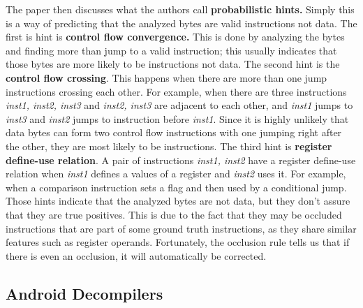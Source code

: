 \documentclass[conference,a4paper]{IEEEtran}
\begin{document}
\noindent The paper then discusses what the authors call \textbf{probabilistic hints.} Simply this is a way of predicting that the analyzed bytes are valid instructions not data. The first is hint is \textbf{control flow convergence.} This is done by analyzing the bytes and finding more than jump to a valid instruction; this usually indicates that those bytes are more likely to be instructions not data. The second hint is the \textbf{control flow crossing}. This happens when there are more than one jump instructions crossing each other. For example, when there are three instructions \emph{inst1, inst2, inst3} and \emph{inst2, inst3} are adjacent to each other, and \emph{inst1} jumps to \emph{inst3} and \emph{inst2} jumps to instruction before \emph{inst1}. Since it is highly unlikely that data bytes can form two control flow instructions with one jumping right after the other, they are most likely to be instructions. The third hint is \textbf{register define-use relation}. A pair of instructions \emph{inst1, inst2} have a register define-use relation when \emph{inst1} defines a values of a register and \emph{inst2} uses it. For example, when a comparison instruction sets a flag and then used by a conditional jump. Those hints indicate that the analyzed bytes are not data, but they don't assure that they are true positives. This is due to the fact that they may be occluded instructions that are part of some ground truth instructions, as they share similar features such as register operands. Fortunately, the occlusion rule tells us that if there is even an occlusion, it will automatically be corrected.

\subsection{Android Decompilers}
\end{document}
